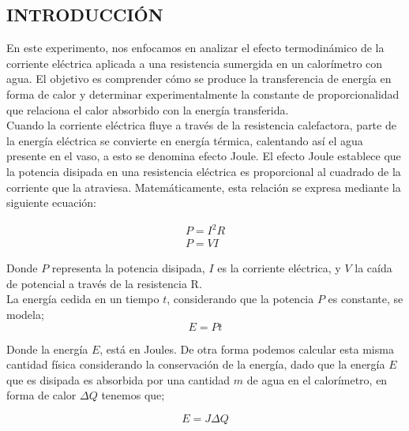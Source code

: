 \documentclass[10pt]{article}
\begin{document}
\begin{multicols*}{2}



\section{\small INTRODUCCIÓN}
En este experimento, nos enfocamos en analizar el efecto termodinámico de la corriente eléctrica aplicada a una resistencia sumergida en un calorímetro con agua. El objetivo es comprender cómo se produce la transferencia de energía en forma de calor y determinar experimentalmente la constante de proporcionalidad que relaciona el calor absorbido con la energía transferida.\\


Cuando la corriente eléctrica fluye a través de la resistencia calefactora, parte de la energía eléctrica se convierte en energía térmica, calentando así el agua presente en el vaso, a esto se denomina efecto Joule. El efecto Joule establece que la potencia disipada en una resistencia eléctrica es proporcional al cuadrado de la corriente que la atraviesa. Matemáticamente, esta relación se expresa mediante la siguiente ecuación:

\begin{equation}
\begin{split}
    P = I^2 R \\
    P = VI
    \label{Potencia}
\end{split}
\end{equation}

Donde $P$ representa la potencia disipada, $I$ es la corriente eléctrica, y $V$ la caída de potencial a través de la resistencia R.\\


La energía cedida en un tiempo $t$, considerando que la potencia $P$ es constante, se modela;
\begin{equation}
    E = Pt
    \label{Energia exp}
\end{equation}

Donde la energía $E$, está en Joules. De otra forma podemos calcular esta misma cantidad física considerando la conservación de la energía, dado que la energía $E$ que es disipada es absorbida por una cantidad $m$ de agua en el calorímetro, en forma de calor $\Delta Q$ tenemos que;

\begin{equation}
    E = J \Delta Q
    \label{Energia teorica}
\end{equation}


\end{multicols*}
\end{document}
